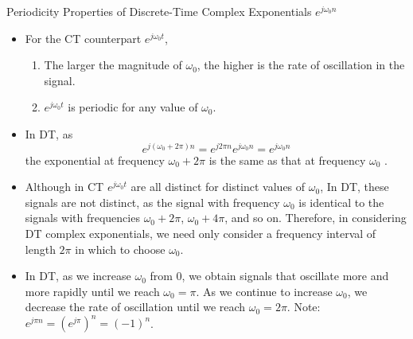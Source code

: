 \begin{frame}{Periodicity Properties of Discrete-Time Complex Exponentials $e^{j\omega_0 n}$}
    \begin{itemize}[<+-| alert@+>]
      \item For the CT counterpart  $e^{j\omega_0 t}$,
        \begin{enumerate}
            \item The larger the magnitude of $\omega_0$, the higher is the rate of oscillation in the signal.
            \item $e^{j\omega_0 t}$ is periodic for any value of $\omega_0$.
        \end{enumerate}
      \item In DT, as
        \begin{equation*}
            e^{j(\omega_0 + 2\pi)n} = e^{j2\pi n}e^{j\omega_0n} = e^{j\omega_0n}
        \end{equation*}
        the exponential at frequency $\omega_0 + 2\pi$ is the same as that at frequency $\omega_0$ .
      \item Although in CT  $e^{j\omega_0 t}$ are all distinct for distinct values of $\omega_0$, In DT, these signals are not distinct, as the signal with frequency $\omega_0$ is identical to the signals with frequencies $\omega_0 + 2\pi$, $\omega_0 + 4\pi$, and so on. Therefore, in considering DT complex exponentials, we need only consider a frequency interval of length $2\pi$ in which to choose $\omega_0$.
      \item In DT, as we increase $\omega_0$ from 0, we obtain signals that oscillate more and more rapidly until we reach $\omega_0 = \pi$. As we continue to increase $\omega_0$, we decrease the rate of oscillation until we reach $\omega_0 = 2\pi$. Note: $e^{j\pi n} = \left(e^{j\pi}\right)^n = (-1)^n$.
    \end{itemize}

\end{frame}


